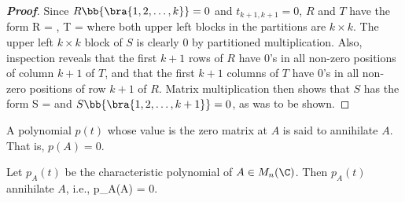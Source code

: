 \begin{proof}[\bf Proof]
Since $R\bb{\bra{1,2,\dots,k}} = 0$ and $t_{k+1,k+1} =0$, $R$ and $T$ have the form
\be
R =  ,\qquad
T = 
\ee
where both upper left blocks in the partitions are $k\times k$. The upper left $k\times k$ block of $S$ is clearly 0 by partitioned multiplication. Also, inspection reveals that the first $k+1$ rows
of $R$ have 0's in all non-zero positions of column $k+1$ of $T$, and that the first $k+1$ columns of $T$ have 0's in all non-zero positions of row $k+1$ of $R$. Matrix multiplication then shows that $S$ has the form
\be
S = 
\ee
and $S\bb{\bra{1,2,\dots,k+1}} = 0$, as was to be shown.
\end{proof}

\begin{definition}\label{def:annihilation_polynomial}
A polynomial $p(t)$ whose value is the zero matrix at $A$ is said to annihilate $A$. That is, $p(A) = 0$.
\end{definition}

\begin{theorem}\label{thm:cayley_hamilton}
Let $p_A(t)$ be the characteristic polynomial of $A\in M_n(\C)$. Then $p_A(t)$ annihilate $A$, i.e.,
\be
p_A(A) = 0.
\ee
\end{theorem}


